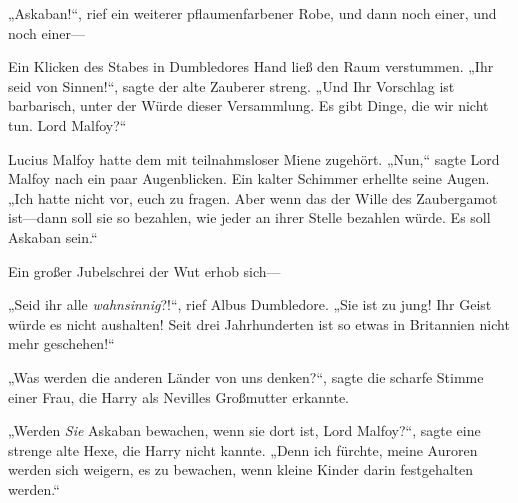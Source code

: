 „Askaban!“, rief ein weiterer pflaumenfarbener Robe, und dann noch einer, und noch einer—

Ein Klicken des Stabes in Dumbledores Hand ließ den Raum verstummen. „Ihr seid von Sinnen!“, sagte der alte Zauberer streng. „Und Ihr Vorschlag ist barbarisch, unter der Würde dieser Versammlung. Es gibt Dinge, die wir nicht tun. Lord Malfoy?“

Lucius Malfoy hatte dem mit teilnahmsloser Miene zugehört.
„Nun,“ sagte Lord Malfoy nach ein paar Augenblicken. Ein kalter Schimmer erhellte seine Augen. „Ich hatte nicht vor, euch zu fragen. Aber wenn das der Wille des Zaubergamot ist—dann soll sie so bezahlen, wie jeder an ihrer Stelle bezahlen würde. Es soll Askaban sein.“

Ein großer Jubelschrei der Wut erhob sich—

„Seid ihr alle \emph{wahnsinnig}?!“, rief Albus Dumbledore. „Sie ist zu jung! Ihr Geist würde es nicht aushalten! Seit drei Jahrhunderten ist so etwas in Britannien nicht mehr geschehen!“

„Was werden die anderen Länder von uns denken?“, sagte die scharfe Stimme einer Frau, die Harry als Nevilles Großmutter erkannte.

„Werden \emph{Sie} Askaban bewachen, wenn sie dort ist, Lord Malfoy?“, sagte eine strenge alte Hexe, die Harry nicht kannte. „Denn ich fürchte, meine Auroren werden sich weigern, es zu bewachen, wenn kleine Kinder darin festgehalten werden.“


